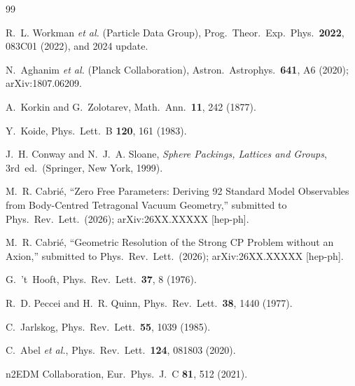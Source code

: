 \documentclass[review,number,sort&compress]{elsarticle}
\begin{document}
\begin{thebibliography}{99}

R.~L. Workman \textit{et al.} (Particle Data Group),
Prog.\ Theor.\ Exp.\ Phys.\ \textbf{2022}, 083C01 (2022),
and 2024 update.

N.~Aghanim \textit{et al.} (Planck Collaboration),
Astron.\ Astrophys.\ \textbf{641}, A6 (2020);
arXiv:1807.06209.

A.~Korkin and G.~Zolotarev,
Math.\ Ann.\ \textbf{11}, 242 (1877).

Y.~Koide,
Phys.\ Lett.\ B \textbf{120}, 161 (1983).

J.~H. Conway and N.~J.~A. Sloane,
\textit{Sphere Packings, Lattices and Groups},
3rd~ed.\ (Springer, New York, 1999).

M.~R. Cabri\'{e},
``Zero Free Parameters: Deriving 92 Standard Model Observables
from Body-Centred Tetragonal Vacuum Geometry,''
submitted to Phys.\ Rev.\ Lett.\ (2026);
arXiv:26XX.XXXXX [hep-ph].

M.~R. Cabri\'{e},
``Geometric Resolution of the Strong CP Problem without an Axion,''
submitted to Phys.\ Rev.\ Lett.\ (2026);
arXiv:26XX.XXXXX [hep-ph].

G.~'t~Hooft,
Phys.\ Rev.\ Lett.\ \textbf{37}, 8 (1976).

R.~D. Peccei and H.~R. Quinn,
Phys.\ Rev.\ Lett.\ \textbf{38}, 1440 (1977).

C.~Jarlskog,
Phys.\ Rev.\ Lett.\ \textbf{55}, 1039 (1985).

C.~Abel \textit{et al.},
Phys.\ Rev.\ Lett.\ \textbf{124}, 081803 (2020).

n2EDM Collaboration,
Eur.\ Phys.\ J.\ C \textbf{81}, 512 (2021).


\end{thebibliography}
\end{document}
